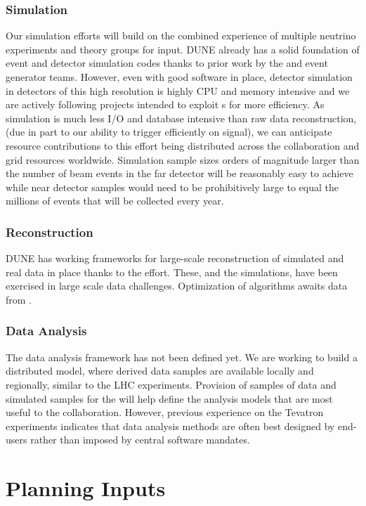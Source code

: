 \subsubsection{Simulation}  Our simulation efforts will build on the combined experience of multiple neutrino experiments and theory groups for input.  DUNE already has a solid foundation of event and detector simulation codes thanks to prior work by the  and event generator teams.  However,   even with good software in place, detector simulation in detectors of this high resolution is highly CPU and memory intensive and we are actively following projects intended to exploit s for more efficiency.  As simulation is much less I/O and database intensive than raw data reconstruction, (due in part to our ability to trigger efficiently on signal), we can anticipate resource contributions to this effort being distributed across the collaboration and grid resources worldwide. Simulation sample sizes orders of magnitude larger than the number of beam events  in the  far detector will be reasonably easy to achieve while near detector samples would need to be prohibitively large to equal the millions of events that will be collected every year. 

\subsubsection{Reconstruction} DUNE has working frameworks for large-scale reconstruction of simulated and real data in place thanks to the  effort.  These, and the simulations, have been exercised in large scale data challenges. Optimization of algorithms awaits data from . 
 
 \subsubsection{Data Analysis}
 The  data analysis framework has not been defined yet.  We are working to build a distributed model, where derived data samples are available locally and regionally, similar to the LHC experiments.   Provision of samples  of  data and simulated samples for the  will help define the analysis models that are most useful to the collaboration. However,  previous experience on the Tevatron experiments indicates that data analysis methods are often best designed by end-users rather than imposed by central software mandates. 
 
 
\section{Planning Inputs}


